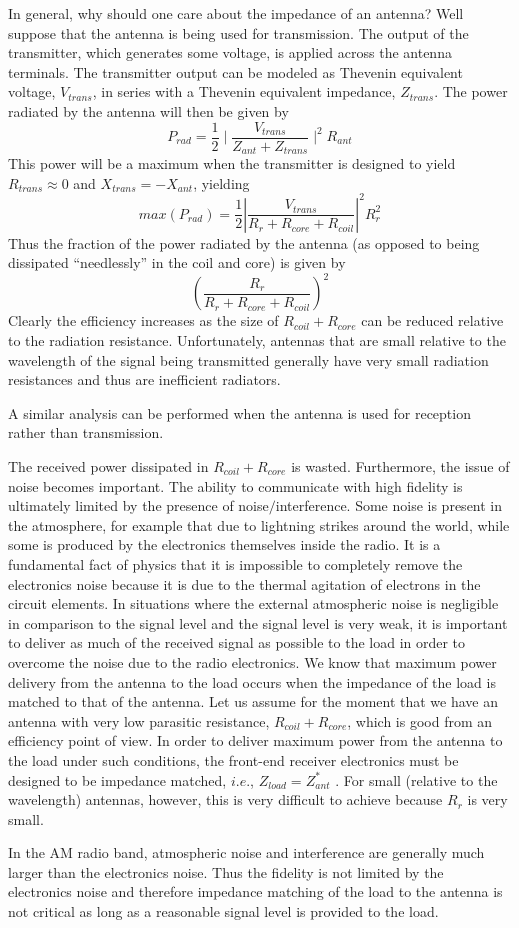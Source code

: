 \documentclass[utf8]{article}
\begin{document}
{	In general, why should one care about the impedance of an antenna? Well suppose that the antenna is being used for transmission. The output of the transmitter, which generates some voltage, is applied across the antenna terminals. The transmitter output can be modeled as Thevenin equivalent voltage, $V_{trans}$, in series with a Thevenin equivalent impedance, $Z_{trans}$. The power radiated by the antenna will then be given by
	$$ P_{rad} = \frac{1}{2}\mid\frac{V_{trans}}{Z_{ant}+Z_{trans}}\mid^2 R_{ant} $$
	This power will be a maximum when the transmitter is designed to yield $R_{trans} \approx 0$ and $X_{trans} = - X_{ant}$, yielding
	$$ max(P_{rad}) = \frac{1}{2}|\frac{V_{trans}}{R_r+R_{core}+R_{coil}}|^2R_r^2$$
	Thus the fraction of the power radiated by the antenna (as opposed to being dissipated “needlessly” in the coil and core) is given by
	$$(\frac{R_r}{R_r+R_{core}+R_{coil}})^2$$
	Clearly the efficiency increases as the size of $R_{coil} + R_{core}$ can be reduced relative to the radiation resistance. Unfortunately, antennas that are small relative to the wavelength of the signal being transmitted generally have very small radiation resistances and thus are inefficient radiators.

	A similar analysis can be performed when the antenna is used for reception rather than transmission.

	The received power dissipated in $R_{coil} + R_{core}$ is wasted. Furthermore, the issue of noise becomes important. The ability to communicate with high fidelity is ultimately limited by the presence of noise$/$interference. Some noise is present in the atmosphere, for example that due to lightning strikes around the world, while some is produced by the electronics themselves inside the radio. It is a fundamental fact of physics that it is impossible to completely remove the electronics noise because it is due to the thermal agitation of electrons in the circuit elements. In situations where the external atmospheric noise is negligible in comparison to the signal level and the signal level is very weak, it is important to deliver as much of the received signal as possible to the load in order to overcome the noise due to the radio electronics. We know that maximum power delivery from the antenna to the load occurs when the impedance of the load is matched to that of the antenna. Let us assume for the moment that we have an antenna with very low parasitic resistance, $R_{coil} + R_{core}$, which is good from an efficiency point of view. In order to deliver maximum power from the antenna to the load under such conditions, the front-end receiver electronics must be designed to be impedance matched, $i.e.$, $Z_{load} = Z_{ant}^{*}$ . For small (relative to the wavelength) antennas, however, this is very difficult to achieve because $R_r$ is very small.

	In the AM radio band, atmospheric noise and interference are generally much larger than the electronics noise. Thus the fidelity is not limited by the electronics noise and therefore impedance matching of the load to the antenna is not critical as long as a reasonable signal level is provided to the load.
}
\end{document}

